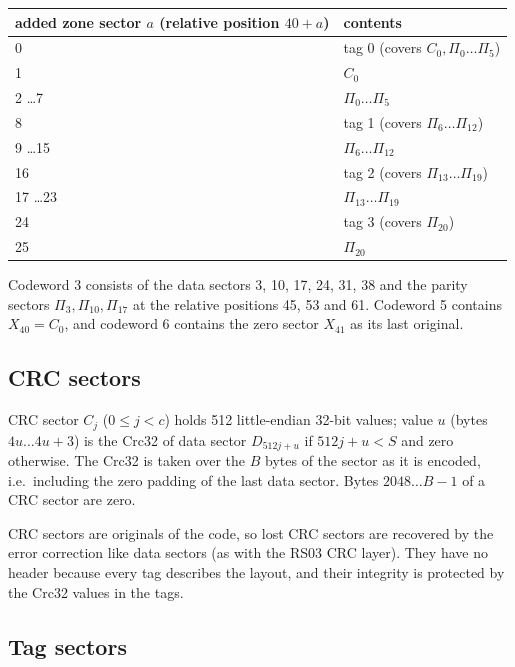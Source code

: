 \begin{center}
\begin{tabular}{|l|l|}
\hline
added zone sector $a$ (relative position $40+a$) & contents \\
\hline
0 & tag 0 (covers $C_0, \Pi_0 \ldots \Pi_5$) \\
1 & $C_0$ \\
2 \ldots 7 & $\Pi_0 \ldots \Pi_5$ \\
8 & tag 1 (covers $\Pi_6 \ldots \Pi_{12}$) \\
9 \ldots 15 & $\Pi_6 \ldots \Pi_{12}$ \\
16 & tag 2 (covers $\Pi_{13} \ldots \Pi_{19}$) \\
17 \ldots 23 & $\Pi_{13} \ldots \Pi_{19}$ \\
24 & tag 3 (covers $\Pi_{20}$) \\
25 & $\Pi_{20}$ \\
\hline
\end{tabular}
\end{center}

Codeword 3 consists of the data sectors 3, 10, 17, 24, 31, 38 and the parity
sectors $\Pi_3, \Pi_{10}, \Pi_{17}$ at the relative positions 45, 53 and 61.
Codeword 5 contains $X_{40} = C_0$, and codeword 6 contains the zero sector
$X_{41}$ as its last original.

\subsection{CRC sectors}
\label{rs04-crc}

CRC sector $C_j$ ($0 \le j < c$) holds 512 little-endian 32-bit values;
value $u$ (bytes $4u \ldots 4u+3$) is the Crc32 of data sector
$D_{512j+u}$ if $512j + u < S$ and zero otherwise. The Crc32 is taken over
the $B$ bytes of the sector as it is encoded, i.e.\ including the zero
padding of the last data sector. Bytes $2048 \ldots B-1$ of a CRC sector are
zero.

\medskip

CRC sectors are originals of the code, so lost CRC sectors are recovered by
the error correction like data sectors (as with the RS03 CRC layer). They
have no header because every tag describes the layout, and their integrity
is protected by the Crc32 values in the tags.

\subsection{Tag sectors}
\label{rs04-tags}

